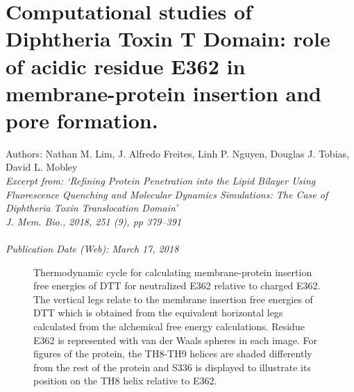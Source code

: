 \chapter{Computational studies of Diphtheria Toxin T Domain: role of acidic residue E362 in membrane-protein insertion and pore formation.} \label{DTT}
\small{Authors: Nathan M. Lim, J. Alfredo Freites, Linh P. Nguyen, Douglas J. Tobias, David L. Mobley}\\
\emph{Excerpt from: `Refining Protein Penetration into the Lipid Bilayer Using Fluorescence Quenching and Molecular Dynamics Simulations: The Case of Diphtheria Toxin Translocation Domain' \cite{Kyrychenko2018}}\\
\emph{J. Mem. Bio., 2018, 251 (9), pp 379--391 \\
\\Publication Date (Web): March 17, 2018}


\begin{figure}[H]
\centering
{}
\caption[Thermodynamic cycle for membrane-protein insertion]{Thermodynamic cycle for calculating membrane-protein insertion free energies of DTT for neutralized E362 relative to charged E362. The vertical legs relate to the membrane insertion free energies of DTT which is obtained from the equivalent horizontal legs calculated from the alchemical free energy calculations. Residue E362 is represented with van der Waals spheres in each image. For figures of the protein, the TH8-TH9 helices are shaded differently from the rest of the protein and S336 is displayed to illustrate its position on the TH8 helix relative to E362.}
\label{fig:dtt_thermo_cycle}
\end{figure}



